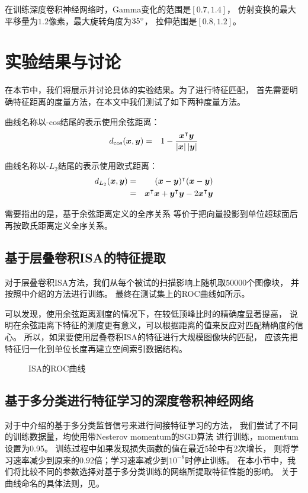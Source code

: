 在训练深度卷积神经网络时，Gamma变化的范围是$[0.7, 1.4]$，
仿射变换的最大平移量为$1.2$像素，最大旋转角度为$35\degree$，
拉伸范围是$[0.8, 1.2]$。


\section{实验结果与讨论}
在本节中，我们将展示并讨论具体的实验结果。为了进行特征匹配，
首先需要明确特征距离的度量方法，在本文中我们测试了如下两种度量方法。

曲线名称以-cos结尾的表示使用余弦距离：
\begin{eqnarray}
    d_{\cos}(\boldsymbol{x}, \boldsymbol{y}) &=& 1 -
        \frac{\boldsymbol{x}^\intercal\boldsymbol{y}}{\left|\boldsymbol{x}\right|\left|\boldsymbol{y}\right|}
\end{eqnarray}

曲线名称以-$L_2$结尾的表示使用欧式距离：
\begin{eqnarray}
    d_{L_2}(\boldsymbol{x}, \boldsymbol{y}) &=&
        (\boldsymbol{x}-\boldsymbol{y})^\intercal(\boldsymbol{x}-\boldsymbol{y}) \nonumber \\
        &=& \boldsymbol{x}^\intercal\boldsymbol{x} + \boldsymbol{y}^\intercal\boldsymbol{y} -
        2\boldsymbol{x}^\intercal\boldsymbol{y}
\end{eqnarray}

需要指出的是，基于余弦距离定义的全序关系
等价于把向量投影到单位超球面后再按欧氏距离定义全序关系。

\subsection{基于层叠卷积ISA的特征提取\label{sec:expr:isa}}
对于层叠卷积ISA方法，我们从每个被试的扫描影响上随机取$50000$个图像块，
并按照中介绍的方法进行训练。
最终在测试集上的ROC曲线如所示。

可以发现，使用余弦距离测度的情况下，在较低顶峰比时的精确度显著提高，
说明在余弦距离下特征的测度更有意义，可以根据距离的值来反应对匹配精确度的信心。
所以，如果要使用层叠卷积ISA的特征进行大规模图像块的匹配，
应该先把特征归一化到单位长度再建立空间索引数据结构。

\begin{figure}[h!]
    \caption{ISA的ROC曲线}
    \label{fig:expr:curve:ISA}
\end{figure}

\subsection{基于多分类进行特征学习的深度卷积神经网络\label{sec:expr:clsfy}}
对于中介绍的基于多分类监督信号来进行间接特征学习的方法，
我们尝试了不同的训练数据量，均使用带Nesterov momentum的SGD算法
\cite{sutskever2013importance}进行训练，momentum设置为0.95。
训练过程中如果发现损失函数的值在最近$5$轮中有$2$次增长，
则将学习速率减少到原来的$0.92$倍；学习速率减少到$10^{-8}$时停止训练。
在本小节中，我们将比较不同的参数选择对基于多分类训练的网络所提取特征性能的影响。
关于曲线命名的具体法则，见。

